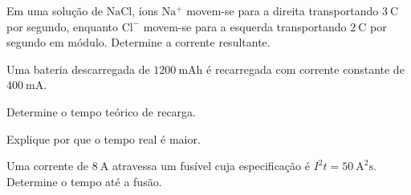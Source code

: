 \begin{questao}[2]{}

Em uma solução de $\mathrm{NaCl}$, íons $\mathrm{Na^{+}}$ movem-se para a
direita transportando $\SI{3}{\coulomb}$ por segundo, enquanto
$\mathrm{Cl^{-}}$ movem-se para a esquerda transportando
$\SI{2}{\coulomb}$ por segundo em módulo. Determine a corrente resultante.


\end{questao}
\begin{questao}[2]{}

Uma bateria descarregada de $\SI{1200}{\milli\ampere\hour}$ é recarregada com
corrente constante de $\SI{400}{\milli\ampere}$.
\begin{itensq}
\item Determine o tempo teórico de recarga.
\item Explique por que o tempo real é maior.
\end{itensq}


\end{questao}
\begin{questao}[2]{}

Uma corrente de $\SI{8}{\ampere}$ atravessa um fusível cuja especificação é
$I^{2}t=\SI{50}{\ampere\squared\second}$. Determine o tempo até a fusão.


\end{questao}

